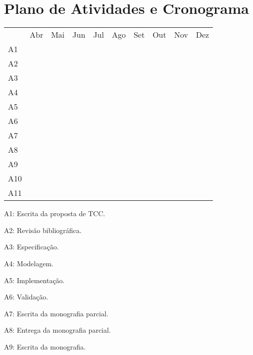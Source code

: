 \documentclass[tcc-proposta]{texufpel}
\begin{document}
\chapter{Plano de Atividades e Cronograma}

	\begin{table}[h!]
		\centering
		\label{my-label}
		\begin{tabular}{llllllllll}
		 & Abr & Mai & Jun & Jul & Ago & Set & Out & Nov & Dez \\
		A1 & \cellcolor[HTML]{9B9B9B} &  &  &  &  &  &  &  &  \\
		A2 &  & \cellcolor[HTML]{9B9B9B} & \cellcolor[HTML]{9B9B9B} &  &  &  &  &  &  \\
		A3 &  &  & \cellcolor[HTML]{9B9B9B} &  &  &  &  &  &  \\
		A4 &  &  & \cellcolor[HTML]{9B9B9B} & \cellcolor[HTML]{9B9B9B} &  &  &  &  &  \\
		A5 &  &  &  & \cellcolor[HTML]{9B9B9B} & \cellcolor[HTML]{9B9B9B} & \cellcolor[HTML]{9B9B9B} & \cellcolor[HTML]{9B9B9B} & \cellcolor[HTML]{9B9B9B} &  \\
		A6 &  &  &  &  &  &  &  & \cellcolor[HTML]{9B9B9B} & \cellcolor[HTML]{9B9B9B} \\
		A7 &  & \cellcolor[HTML]{9B9B9B} & \cellcolor[HTML]{9B9B9B} & \cellcolor[HTML]{9B9B9B} &  &  &  &  &  \\
		A8 &  &  &  & \cellcolor[HTML]{9B9B9B} &  &  &  &  &  \\
		A9 &  &  &  & \cellcolor[HTML]{9B9B9B} & \cellcolor[HTML]{9B9B9B} & \cellcolor[HTML]{9B9B9B} & \cellcolor[HTML]{9B9B9B} & \cellcolor[HTML]{9B9B9B} &  \\
		A10 &  &  &  &  &  &  &  & \cellcolor[HTML]{9B9B9B} &  \\
		A11 &  &  &  &  &  &  &  &  & \cellcolor[HTML]{9B9B9B}
		\end{tabular}
		\end{table}
	
	A1: Escrita da proposta de TCC.
	
	A2: Revisão bibliográfica.
	
	A3: Especificação.
	
	A4: Modelagem.
	
	A5: Implementação.
	
	A6: Validação.
	
	A7: Escrita da monografia parcial.
	
	A8: Entrega da monografia parcial.
	
	A9: Escrita da monografia.
	
\end{document}
